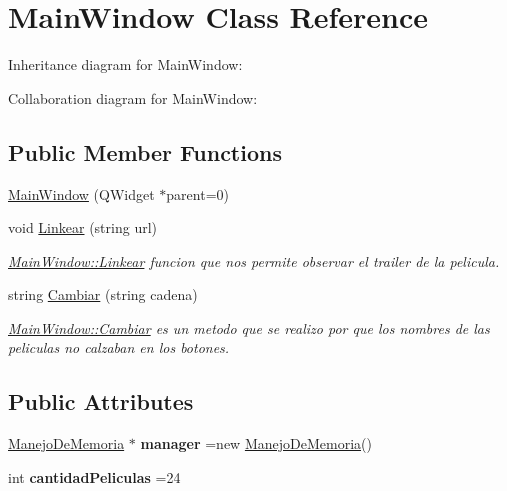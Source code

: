 \hypertarget{classMainWindow}{}\section{Main\+Window Class Reference}
\label{classMainWindow}


Inheritance diagram for Main\+Window\+:


Collaboration diagram for Main\+Window\+:
\subsection*{Public Member Functions}
\begin{DoxyCompactItemize}
\item 
\hyperlink{classMainWindow_a8b244be8b7b7db1b08de2a2acb9409db}{Main\+Window} (Q\+Widget $\ast$parent=0)
\item 
void \hyperlink{classMainWindow_ae50b6ad489f04f87597e89951ebb32f5}{Linkear} (string url)
\begin{DoxyCompactList}\small\item\em \hyperlink{classMainWindow_ae50b6ad489f04f87597e89951ebb32f5}{Main\+Window\+::\+Linkear} funcion que nos permite observar el trailer de la pelicula. \end{DoxyCompactList}\item 
string \hyperlink{classMainWindow_abc32b15541cc089bb38675046b2d6f36}{Cambiar} (string cadena)
\begin{DoxyCompactList}\small\item\em \hyperlink{classMainWindow_abc32b15541cc089bb38675046b2d6f36}{Main\+Window\+::\+Cambiar} es un metodo que se realizo por que los nombres de las peliculas no calzaban en los botones. \end{DoxyCompactList}\end{DoxyCompactItemize}
\subsection*{Public Attributes}
\begin{DoxyCompactItemize}
\item 
\mbox{\label{classMainWindow_a23795fa875787a03133281ab53452de8}} 
\hyperlink{classManejoDeMemoria}{Manejo\+De\+Memoria} $\ast$ {\bfseries manager} =new \hyperlink{classManejoDeMemoria}{Manejo\+De\+Memoria}()
\item 
\mbox{\label{classMainWindow_ab4facbc90ab74f67d4d2a730bda56b07}} 
int {\bfseries cantidad\+Peliculas} =24
\end{DoxyCompactItemize}
